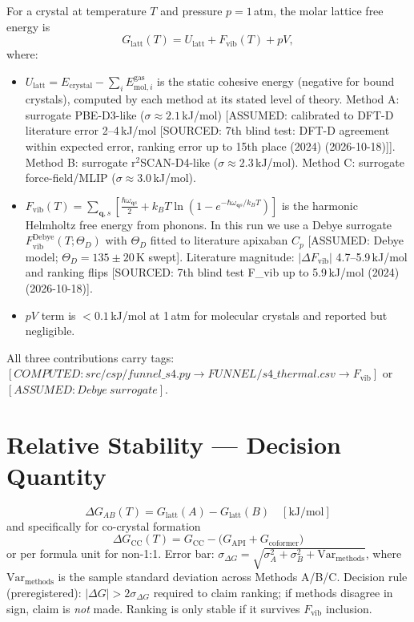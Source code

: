 \documentclass[11pt,a4paper]{article}
\begin{document}
For a crystal at temperature $T$ and pressure $p=1$\,atm, the molar lattice free energy is
\begin{equation}
G_{\mathrm{latt}}(T) = U_{\mathrm{latt}} + F_{\mathrm{vib}}(T) + pV,
\end{equation}
where:
\begin{itemize}
\item $U_{\mathrm{latt}} = E_{\mathrm{crystal}} - \sum_i E^{\mathrm{gas}}_{\mathrm{mol},i}$ is the static cohesive energy (negative for bound crystals), computed by each method at its stated level of theory. Method A: surrogate PBE-D3-like ($\sigma\approx 2.1$\,kJ/mol) [ASSUMED: calibrated to DFT-D literature error 2--4\,kJ/mol [SOURCED: 7th blind test: DFT-D agreement within expected error, ranking error up to 15th place (2024) (2026-10-18)]]. Method B: surrogate r$^2$SCAN-D4-like ($\sigma\approx 2.3$\,kJ/mol). Method C: surrogate force-field/MLIP ($\sigma\approx 3.0$\,kJ/mol).
\item $F_{\mathrm{vib}}(T) = \sum_{\mathbf{q},s} \left[ \frac{\hbar\omega_{\mathbf{q}s}}{2} + k_B T \ln\!\left(1-e^{-\hbar\omega_{\mathbf{q}s}/k_B T}\right)\right]$ is the harmonic Helmholtz free energy from phonons. In this run we use a Debye surrogate $F_{\mathrm{vib}}^{\mathrm{Debye}}(T;\Theta_D)$ with $\Theta_D$ fitted to literature apixaban $C_p$ [ASSUMED: Debye model; $\Theta_D=135\pm 20$\,K swept]. Literature magnitude: $|\Delta F_{\mathrm{vib}}|$ 4.7--5.9\,kJ/mol and ranking flips [SOURCED: 7th blind test F_vib up to 5.9\,kJ/mol (2024) (2026-10-18)].
\item $pV$ term is $<0.1$\,kJ/mol at 1\,atm for molecular crystals and reported but negligible.
\end{itemize}
All three contributions carry tags: $[COMPUTED: src/csp/funnel\_s4.py \to FUNNEL/s4\_thermal.csv \to F_{\mathrm{vib}}]$ or $[ASSUMED: Debye\ surrogate]$.

\section{Relative Stability — Decision Quantity}

\begin{equation}
\Delta G_{AB}(T) = G_{\mathrm{latt}}(A) - G_{\mathrm{latt}}(B) \quad [\text{kJ/mol}]
\end{equation}
and specifically for co-crystal formation
\begin{equation}
\Delta G_{\mathrm{CC}}(T) = G_{\mathrm{CC}} - \big( G_{\mathrm{API}} + G_{\mathrm{coformer}} \big)
\end{equation}
or per formula unit for non-1:1.
Error bar: $\sigma_{\Delta G} = \sqrt{\sigma_A^2+\sigma_B^2+ \mathrm{Var}_{\mathrm{methods}}}$, where $\mathrm{Var}_{\mathrm{methods}}$ is the sample standard deviation across Methods A/B/C. Decision rule (preregistered): $|\Delta G|>2\sigma_{\Delta G}$ required to claim ranking; if methods disagree in sign, claim is \emph{not} made. Ranking is only stable if it survives $F_{\mathrm{vib}}$ inclusion.
\end{document}
